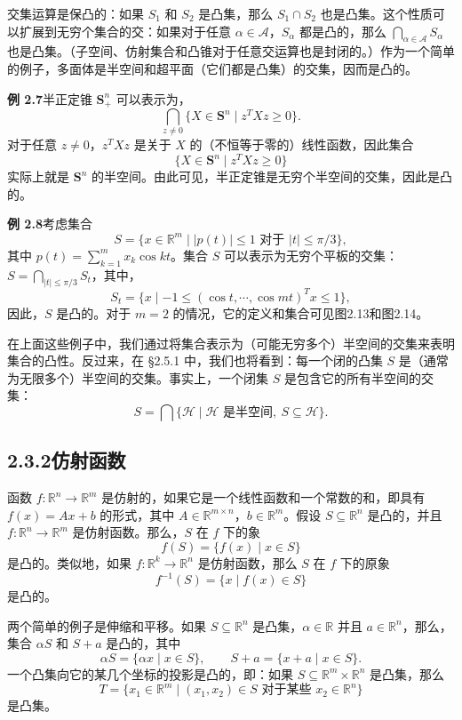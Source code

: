 \documentclass[UTF8, 12pt, fontset=fandol, oneside]{ctexart}
\begin{document}
交集运算是保凸的：如果 $S_1$ 和 $S_2$ 是凸集，那么 $S_1\cap S_2$ 也是凸集。这个性质可以扩展到无穷个集合的交：如果对于任意 $\alpha\in\mathcal{A}$，$S_\alpha$ 都是凸的，那么 $\bigcap_{\alpha\in\mathcal{A}}S_\alpha$ 也是凸集。（子空间、仿射集合和凸锥对于任意交运算也是封闭的。）作为一个简单的例子，多面体是半空间和超平面（它们都是凸集）的交集，因而是凸的。

\noindent\textbf{例 2.7}\quad 半正定锥 $\mathbf{S}_+^n$ 可以表示为，
\[
  \bigcap_{z\ne 0}\{X\in\mathbf{S}^n\mid z^TXz\ge 0\}.
\]
对于任意 $z\ne 0$，$z^TXz$ 是关于 $X$ 的（不恒等于零的）线性函数，因此集合
\[
  \{X\in\mathbf{S}^n\mid z^TXz\ge 0\}
\]
实际上就是 $\mathbf{S}^n$ 的半空间。由此可见，半正定锥是无穷个半空间的交集，因此是凸的。

\noindent\textbf{例 2.8}\quad 考虑集合
\begin{equation}
  S=\{x\in\mathbb{R}^m\mid |p(t)|\le 1\text{ 对于 }|t|\le \pi/3\},
  \tag{2.10}
\end{equation}
其中 $p(t)=\sum_{k=1}^m x_k\cos kt$。集合 $S$ 可以表示为无穷个平板的交集：$S=\bigcap_{|t|\le\pi/3}S_t$，其中，
\[
  S_t=\{x\mid -1\le (\cos t,\cdots,\cos mt)^Tx\le 1\},
\]
因此，$S$ 是凸的。对于 $m=2$ 的情况，它的定义和集合可见图2.13和图2.14。

在上面这些例子中，我们通过将集合表示为（可能无穷多个）半空间的交集来表明集合的凸性。反过来，在 §2.5.1 中，我们也将看到：每一个闭的凸集 $S$ 是（通常为无限多个）半空间的交集。事实上，一个闭集 $S$ 是包含它的所有半空间的交集：
\[
  S=\bigcap\{\mathcal{H}\mid \mathcal{H}\text{ 是半空间},\ S\subseteq\mathcal{H}\}.
\]

\subsection*{2.3.2\quad 仿射函数}

函数 $f:\mathbb{R}^n\to\mathbb{R}^m$ 是仿射的，如果它是一个线性函数和一个常数的和，即具有 $f(x)=Ax+b$ 的形式，其中 $A\in\mathbb{R}^{m\times n}$，$b\in\mathbb{R}^m$。假设 $S\subseteq\mathbb{R}^n$ 是凸的，并且 $f:\mathbb{R}^n\to\mathbb{R}^m$ 是仿射函数。那么，$S$ 在 $f$ 下的象
\[
  f(S)=\{f(x)\mid x\in S\}
\]
是凸的。类似地，如果 $f:\mathbb{R}^k\to\mathbb{R}^n$ 是仿射函数，那么 $S$ 在 $f$ 下的原象
\[
  f^{-1}(S)=\{x\mid f(x)\in S\}
\]
是凸的。

两个简单的例子是伸缩和平移。如果 $S\subseteq\mathbb{R}^n$ 是凸集，$\alpha\in\mathbb{R}$ 并且 $a\in\mathbb{R}^n$，那么，集合 $\alpha S$ 和 $S+a$ 是凸的，其中
\[
  \alpha S=\{\alpha x\mid x\in S\},\qquad S+a=\{x+a\mid x\in S\}.
\]
一个凸集向它的某几个坐标的投影是凸的，即：如果 $S\subseteq\mathbb{R}^m\times\mathbb{R}^n$ 是凸集，那么
\[
  T=\{x_1\in\mathbb{R}^m\mid (x_1,x_2)\in S\text{ 对于某些 }x_2\in\mathbb{R}^n\}
\]
是凸集。
\end{document}
